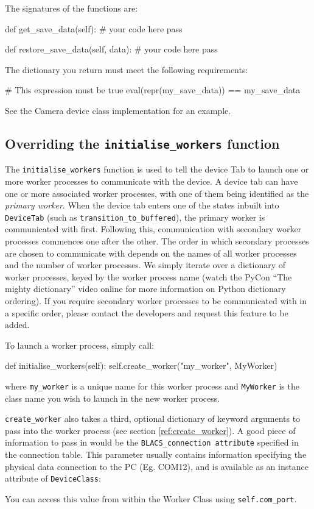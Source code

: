 \documentclass[12pt]{article}
\begin{document}
The signatures of the functions are:
\begin{python}
def get_save_data(self):
	# your code here
	pass
	
def restore_save_data(self, data):
	# your code here
	pass
\end{python}

The dictionary you return must meet the following requirements:
\begin{python}
# This expression must be true
eval(repr(my_save_data)) == my_save_data 
\end{python}

See the Camera device class implementation for an example.

\subsection{Overriding the \texttt{initialise\_workers} function}\label{tutorial:initialise_workers}
The \texttt{initialise\_workers} function is used to tell the device Tab to launch one or more worker processes to communicate with the device.
A device tab can have one or more associated worker processes, with one of them being identified as the \textit{primary worker}.
When the device tab enters one of the states inbuilt into \texttt{DeviceTab} (such as \texttt{transition\_to\_buffered}), the primary worker is communicated with first. 
Following this, communication with secondary worker processes commences one after the other.
The order in which secondary processes are chosen to communicate with depends on the names of all worker processes and the number of worker processes.
We simply iterate over a dictionary of worker processes, keyed by the worker process name (watch the PyCon ``The mighty dictionary'' video online for more information on Python dictionary ordering).
If you require secondary worker processes to be communicated with in a specific order, please contact the developers and request this feature to be added.

To launch a worker process, simply call:
\begin{python}
def initialise_workers(self):
    self.create_worker("my_worker", MyWorker)
\end{python}
where \texttt{my\_worker} is a unique name for this worker process and \texttt{MyWorker} is the class name you wish to launch in the new worker process.

\texttt{create\_worker} also takes a third, optional dictionary of keyword arguments to pass into the worker process (see section \ref{ref:create_worker}).
A good piece of information to pass in would be the \texttt{BLACS\_connection attribute} specified in the connection table.
This parameter usually contains information specifying the physical data connection to the PC (Eg. COM12), and is available as an instance attribute of \texttt{DeviceClass}:
\begin{python}
def initialise_workers(self):
    self.create_worker("my_worker", MyWorker,{'com_port':str(self.BLACS_connection))
\end{python}
You can access this value from within the Worker Class using \texttt{self.com\_port}.
\end{document}
